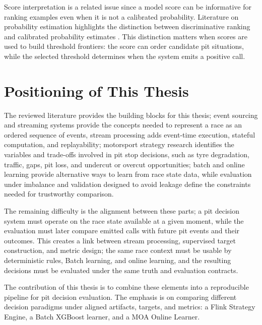 Score interpretation is a related issue since a model score can be informative for ranking examples even when it is not a calibrated probability. Literature on probability estimation
highlights the distinction between discriminative ranking and calibrated probability estimates \citep{niculescu2005goodprob,guo2017calibration}. This distinction matters
when scores are used to build threshold frontiers: the score can order candidate pit situations, while the selected threshold determines when the system emits a positive call.

\section{Positioning of This Thesis}

The reviewed literature provides the building blocks for this thesis; event sourcing and streaming systems provide the concepts needed to represent a race as an ordered
sequence of events, stream processing adds event-time execution, stateful computation, and replayability; motorsport strategy research identifies the variables and
trade-offs involved in pit stop decisions, such as tyre degradation, traffic, gaps, pit loss, and undercut or overcut opportunities; batch and online learning provide
alternative ways to learn from race state data, while evaluation under imbalance and validation designed to avoid leakage define the constraints needed for trustworthy
comparison.

The remaining difficulty is the alignment between these parts; a pit decision system must operate on the race state available at a given moment, while the evaluation must
later compare emitted calls with future pit events and their outcomes. This creates a link between stream processing, supervised target construction, and metric design;
the same race context must be usable by deterministic rules, Batch learning, and online learning, and the resulting decisions must be evaluated under the same truth and
evaluation contracts.

The contribution of this thesis is to combine these elements into a reproducible pipeline for pit decision evaluation. The emphasis is on comparing different decision
paradigms under aligned artifacts, targets, and metrics: a Flink Strategy Engine, a Batch XGBoost learner, and a MOA Online Learner.
